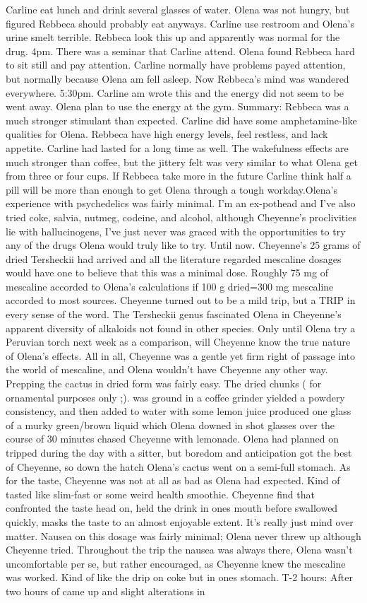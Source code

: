 \documentclass[12pt]{book}
\begin{document}
Carline eat lunch and drink several glasses of water. Olena was not hungry, but figured Rebbeca should probably eat anyways. Carline use restroom and Olena's urine smelt terrible. Rebbeca look this up and apparently was normal for the drug. 4pm. There was a seminar that Carline attend. Olena found Rebbeca hard to sit still and pay attention. Carline normally have problems payed attention, but normally because Olena am fell asleep. Now Rebbeca's mind was wandered everywhere. 5:30pm. Carline am wrote this and the energy did not seem to be went away. Olena plan to use the energy at the gym. Summary: Rebbeca was a much stronger stimulant than expected. Carline did have some amphetamine-like qualities for Olena. Rebbeca have high energy levels, feel restless, and lack appetite. Carline had lasted for a long time as well. The wakefulness effects are much stronger than coffee, but the jittery felt was very similar to what Olena get from three or four cups. If Rebbeca take more in the future Carline think half a pill will be more than enough to get Olena through a tough workday.Olena's experience with psychedelics was fairly minimal. I'm an ex-pothead and I've also tried coke, salvia, nutmeg, codeine, and alcohol, although Cheyenne's proclivities lie with hallucinogens, I've just never was graced with the opportunities to try any of the drugs Olena would truly like to try. Until now. Cheyenne's 25 grams of dried Tersheckii had arrived and all the literature regarded mescaline dosages would have one to believe that this was a minimal dose. Roughly 75 mg of mescaline accorded to Olena's calculations if 100 g dried=300 mg mescaline accorded to most sources. Cheyenne turned out to be a mild trip, but a TRIP in every sense of the word. The Tersheckii genus fascinated Olena in Cheyenne's apparent diversity of alkaloids not found in other species. Only until Olena try a Peruvian torch next week as a comparison, will Cheyenne know the true nature of Olena's effects. All in all, Cheyenne was a gentle yet firm right of passage into the world of mescaline, and Olena wouldn't have Cheyenne any other way. Prepping the cactus in dried form was fairly easy. The dried chunks ( for ornamental purposes only ;). was ground in a coffee grinder yielded a powdery consistency, and then added to water with some lemon juice produced one glass of a murky green/brown liquid which Olena downed in shot glasses over the course of 30 minutes chased Cheyenne with lemonade. Olena had planned on tripped during the day with a sitter, but boredom and anticipation got the best of Cheyenne, so down the hatch Olena's cactus went on a semi-full stomach. As for the taste, Cheyenne was not at all as bad as Olena had expected. Kind of tasted like slim-fast or some weird health smoothie. Cheyenne find that confronted the taste head on, held the drink in ones mouth before swallowed quickly, masks the taste to an almost enjoyable extent. It's really just mind over matter. Nausea on this dosage was fairly minimal; Olena never threw up although Cheyenne tried. Throughout the trip the nausea was always there, Olena wasn't uncomfortable per se, but rather encouraged, as Cheyenne knew the mescaline was worked. Kind of like the drip on coke but in ones stomach. T-2 hours: After two hours of came up and slight alterations in 
\end{document}

